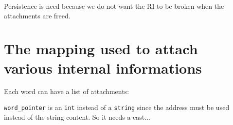 Persistence is need because we do not want the RI to be broken when
the attachments are freed.



\section{The mapping used to attach various internal informations}


Each word can have a list of attachments:

\verb|word_pointer| is an {\tt int} instead of a {\tt string} since
the address must be used instead of the string content. So it needs a
cast...



